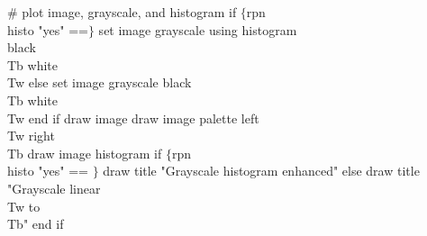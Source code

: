 \# plot image, grayscale, and histogram
if $\lbrace$rpn \\histo "yes" ==$\rbrace$
    set image grayscale using histogram \\
        black \\Tb white \\Tw
else
    set image grayscale black \\Tb white \\Tw
end if
draw image
draw image palette left \\Tw right \\Tb
draw image histogram
if $\lbrace$rpn \\histo "yes" == $\rbrace$
    draw title "Grayscale histogram enhanced"
else
    draw title "Grayscale linear \\Tw to \\Tb"
end if
\endexample


\notice

\bye
